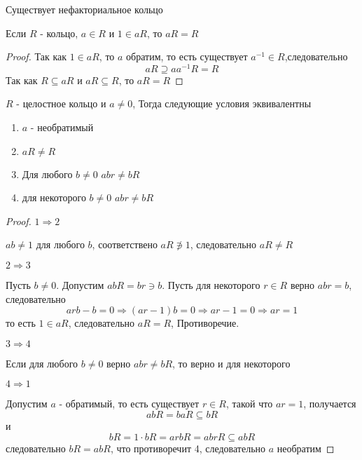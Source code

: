 \documentclass[../main/document.tex]{subfiles}
\begin{document}
\begin{thm}
Существует нефакториальное кольцо
\end{thm}
\begin{lemma}
Если $R$ - кольцо, $a\in R$ и $1\in aR$, то $aR=R$
\begin{proof}
Так как $1\in aR$, то $a$ обратим, то есть существует $a^{-1}\in R$,следовательно
$$aR\supseteq aa^{-1}R= R$$
Так как $R\subseteq aR$ и $aR\subseteq R$, то $aR=R$
\end{proof}
\end{lemma}
\begin{thm}
$R$ - целостное кольцо и $a\neq 0$, Тогда следующие условия эквивалентны
\begin{enumerate}
\item $a$ - необратимый
\item $aR\neq R$
\item Для любого $b\neq 0$ $abr\neq bR$
\item для некоторого $b\neq 0$ $abr\neq bR$
\end{enumerate}
\begin{proof}

$1\Rightarrow 2$

$ab\neq 1$ для любого $b$, соответствено $aR\not\ni 1$, следовательно $aR\neq R$

$2\Rightarrow 3$

Пусть $b\neq 0$. Допустим $abR=br\ni b$. Пусть для некоторого $r\in R$ верно $abr=b$, следовательно
$$arb-b=0\Rightarrow (ar-1)b=0\Rightarrow ar-1=0\Rightarrow ar=1$$
то есть $1\in aR$, следовательно $aR=R$, Противоречие.

$3\Rightarrow 4$

Если для любого  $b\neq 0$ верно $abr\neq bR$, то верно и для некоторого

$4\Rightarrow 1$

Допустим $a$ - обратимый, то есть существует $r\in R$, такой что $ar=1$, получается
$$abR=baR\subseteq bR$$
и
$$bR=1\cdot bR=arbR=abrR\subseteq abR$$
следовательно $bR=abR$, что противоречит 4, следовательно $a$ необратим
\end{proof}
\end{thm}
\end{document}

